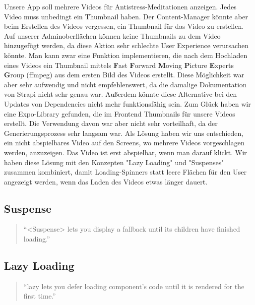 \begin{spacing}{1}
    Unsere App soll mehrere Videos für Antistress-Meditationen anzeigen.
    Jedes Video muss unbedingt ein Thumbnail haben.
    Der Content-Manager könnte aber beim Erstellen des Videos vergessen,
    ein Thumbnail für das Video zu erstellen.
    Auf unserer Adminoberflächen können keine Thumbnails zu dem Video hinzugefügt werden,
    da diese Aktion sehr schlechte User Experience verursachen könnte.
    Man kann zwar eine Funktion implementieren,
    die nach dem Hochladen eines Videos ein Thumbnail mittels \textbf{F}ast \textbf{F}orward \textbf{M}oving
    \textbf{P}icture \textbf{E}xperts \textbf{G}roup (ffmpeg) aus dem ersten Bild des Videos erstellt.
    Diese Möglichkeit war aber sehr aufwendig und nicht empfehlenswert, da die damalige Dokumentation von
    Strapi nicht sehr genau war.
    Außerdem könnte diese Alternative bei den Updates von Dependencies nicht mehr funktionsfähig sein.
    Zum Glück haben wir eine Expo-Library gefunden, die im Frontend Thumbnails für unsere Videos erstellt.
    Die Verwendung davon war aber nicht sehr vorteilhaft, da der Generierungsprozess sehr langsam war.
    Als Lösung haben wir uns entschieden, ein nicht abspielbares Video auf den Screens, wo mehrere Videos vorgeschlagen werden,
    anzuzeigen.
    Das Video ist erst abspielbar, wenn man darauf klickt.
    Wir haben diese Lösung mit den Konzepten "Lazy Loading" und "Suspenses" zusammen kombiniert,
    damit Loading-Spinners statt leere Flächen für den User angezeigt werden,
    wenn das Laden des Videos etwas länger dauert.



    \subsection{Suspense}\label{subsec:suspense}

    \begin{quotation}

        ``<Suspense> lets you display a fallback until its children have finished
        loading.''~\cite{suspense}
    \end{quotation}

    \subsection{Lazy Loading}\label{subsec:lazy-loading}

    \begin{quotation}
        ``lazy lets you defer loading component’s code until it is rendered for
        the first time.''~\cite{lazyLoading}
    \end{quotation}



\end{spacing}
